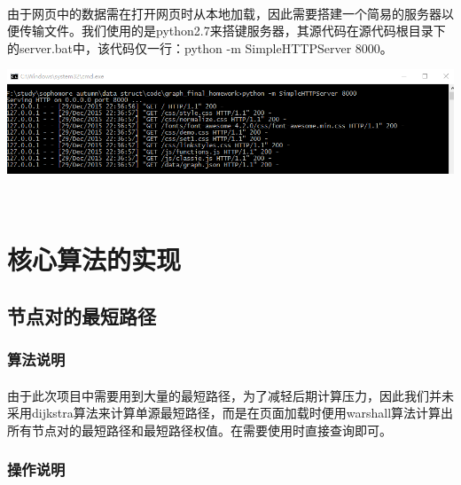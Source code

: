 \documentclass{article}
\begin{document}
\begin{CJK}{UTF8}{gkai}
	\paragraph{}
	由于网页中的数据需在打开网页时从本地加载，因此需要搭建一个简易的服务器以便传输文件。我们使用的是python2.7来搭键服务器，其源代码在源代码根目录下的server.bat中，该代码仅一行：python -m SimpleHTTPServer 8000。
	\\[\intextsep] 
	\begin{minipage}{\textwidth} 
	    \centering 
	    \includegraphics[width=0.9\linewidth]{server.PNG}
	\end{minipage} 
	\\[\intextsep] 

\section{核心算法的实现} %
	\subsection{节点对的最短路径}
		\subsubsection{算法说明} %
			\paragraph{}
			由于此次项目中需要用到大量的最短路径，为了减轻后期计算压力，因此我们并未采用dijkstra算法来计算单源最短路径，而是在页面加载时便用warshall算法计算出所有节点对的最短路径和最短路径权值。在需要使用时直接查询即可。
		\subsubsection{操作说明}

\end{CJK}
\end{document}
